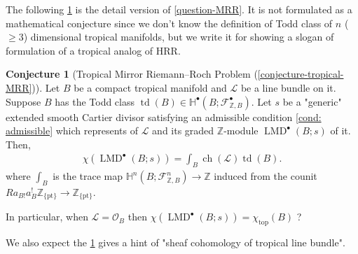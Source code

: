 \documentclass[a4paper,dvipdfmx,reqno,12pt]{amsart}
\theoremstyle{definition}
\newtheorem{conjecture}[theorem]{Conjecture}
\newcommand{\Z}{\mathbb{Z}}%
\newcommand{\mb}[1]{\mathbb{#1}}%
\newcommand{\mcal}[1]{\mathcal{#1}}%
\newcommand{\opn}[1]{\operatorname{#1}}
\numberwithin{equation}{section}
\begin{document}
The following \cref{conjecture-tropical-MRR-preface}
is the detail version of \cref{question-MRR}.
It is not formulated as a mathematical 
conjecture since we don't know the definition of Todd 
class of $n$ ($\geq 3$) dimensional tropical manifolds,
but we write it for showing a slogan of formulation 
of a tropical analog of HRR.

\begin{conjecture}[{Tropical Mirror Riemann--Roch Problem
(\cref{conjecture-tropical-MRR})}]
\label{conjecture-tropical-MRR-preface}
Let $B$ be a compact tropical manifold and $\mcal{L}$
be a line bundle on it. Suppose $B$ has the Todd class
$\opn{td}(B) \in \mb{H}^{\bullet}(B;\mcal{F}_{\Z, B}^{\bullet})$.
 Let $s$ be a "generic"
extended smooth Cartier divisor satisfying an admissible condition 
\cref{cond: admissible} which represents of $\mcal{L}$
and its graded $\Z$-module $\opn{LMD}^{\bullet}(B;s)$
of it.
Then,
\begin{align}
\chi(\opn{LMD}^{\bullet}(B;s))=\int_B \opn{ch}(\mcal{L})\opn{td}(B).
\end{align}
where $\int_B$ is the trace map 
$\mb{H}^{n}(B;\mcal{F}_{\Z, B}^{n})\to \Z$
induced from the counit 
$Ra_{B!}a_{B}^{!}\mathbb{Z}_{\{\mathrm{pt}\}}
\to \mathbb{Z}_{\{\mathrm{pt}\}}$.

In particular, when $\mcal{L}=\mcal{O}_B$ then
$\chi(\opn{LMD}^{\bullet}(B;s))=\chi_{\opn{top}}(B)$ ?
\end{conjecture}

We also expect the \cref{conjecture-tropical-MRR-preface}
gives a hint of   
"sheaf cohomology of tropical line bundle". 
\end{document}
